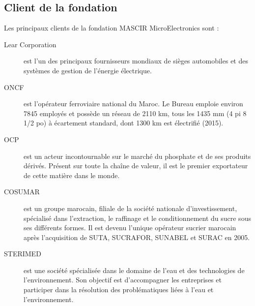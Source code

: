 \documentclass[11pt, a4paper, twoside]{book}
\begin{document}
\subsection{Client de la fondation}
Les principaux clients de la fondation MASCIR MicroElectronics sont :
\begin{description}
\item[Lear Corporation] est l’un des principaux fournisseurs mondiaux de sièges automobiles et des systèmes de gestion de l’énergie électrique.
\item[ONCF] est l'opérateur ferroviaire national du Maroc. Le Bureau emploie environ 7845 employés et possède un réseau de 2110 km, tous les 1435 mm (4 pi 8 1/2 po) à écartement standard, dont 1300 km est électrifié (2015).
\item[OCP] est un acteur incontournable sur le marché du phosphate et de ses produits dérivés. Présent sur toute la chaîne de valeur, il est le premier exportateur de cette matière dans le monde.
\item[COSUMAR] est un groupe marocain, filiale de la société nationale d'investissement, spécialisé dans l'extraction, le raffinage et le conditionnement du sucre sous ses différents formes. Il est devenu l'unique opérateur sucrier marocain après l'acquisition de SUTA, SUCRAFOR, SUNABEL et SURAC en 2005.
\item[STERIMED] est une société spécialisée dans le domaine de l’eau et des technologies de l’environnement. Son objectif est d’accompagner les entreprises et participer dans la résolution des problématiques liées à l’eau et l’environnement.
\end{description}
\end{document}
